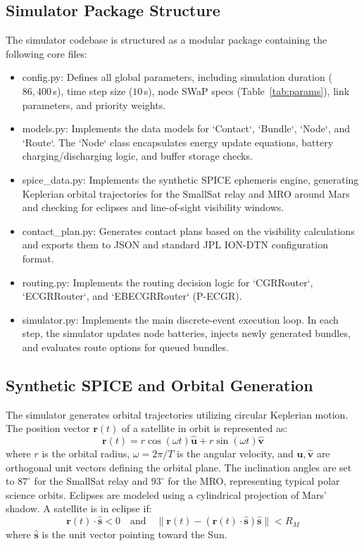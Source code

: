 \documentclass[journal,twocolumn]{IEEEtran}
\begin{document}
\subsection{Simulator Package Structure}
The simulator codebase is structured as a modular package containing the following core files:
\begin{itemize}
    \item \textsf{config.py:} Defines all global parameters, including simulation duration ($86{,}400\,$s), time step size ($10\,$s), node SWaP specs (Table~\ref{tab:params}), link parameters, and priority weights.
    \item \textsf{models.py:} Implements the data models for `Contact`, `Bundle`, `Node`, and `Route`. The `Node` class encapsulates energy update equations, battery charging/discharging logic, and buffer storage checks.
    \item \textsf{spice\_data.py:} Implements the synthetic SPICE ephemeris engine, generating Keplerian orbital trajectories for the SmallSat relay and MRO around Mars and checking for eclipses and line-of-sight visibility windows.
    \item \textsf{contact\_plan.py:} Generates contact plans based on the visibility calculations and exports them to JSON and standard JPL ION-DTN configuration format.
    \item \textsf{routing.py:} Implements the routing decision logic for `CGRRouter`, `ECGRRouter`, and `EBECGRRouter` (P-ECGR).
    \item \textsf{simulator.py:} Implements the main discrete-event execution loop. In each step, the simulator updates node batteries, injects newly generated bundles, and evaluates route options for queued bundles.
\end{itemize}

\subsection{Synthetic SPICE and Orbital Generation}
The simulator generates orbital trajectories utilizing circular Keplerian motion. The position vector $\mathbf{r}(t)$ of a satellite in orbit is represented as:
\begin{equation}
    \mathbf{r}(t) = r \cos(\omega t) \mathbf{\hat{u}} + r \sin(\omega t) \mathbf{\hat{v}}
\end{equation}
where $r$ is the orbital radius, $\omega = 2\pi / T$ is the angular velocity, and $\mathbf{\hat{u}}, \mathbf{\hat{v}}$ are orthogonal unit vectors defining the orbital plane. The inclination angles are set to $87^\circ$ for the SmallSat relay and $93^\circ$ for the MRO, representing typical polar science orbits. Eclipses are modeled using a cylindrical projection of Mars' shadow. A satellite is in eclipse if:
\begin{equation}
    \mathbf{r}(t) \cdot \mathbf{\hat{s}} < 0 \quad \text{and} \quad \|\mathbf{r}(t) - (\mathbf{r}(t) \cdot \mathbf{\hat{s}})\mathbf{\hat{s}}\| < R_M
\end{equation}
where $\mathbf{\hat{s}}$ is the unit vector pointing toward the Sun.
\end{document}
